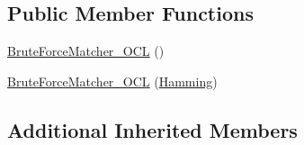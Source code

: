 \subsection*{Public Member Functions}
\begin{DoxyCompactItemize}
\item 
\hyperlink{classcv_1_1ocl_1_1BruteForceMatcher__OCL_3_01Hamming_01_4_a2e3e0dab5ac7caaf75fe7db67292d9a5}{Brute\-Force\-Matcher\-\_\-\-O\-C\-L} ()
\item 
\hyperlink{classcv_1_1ocl_1_1BruteForceMatcher__OCL_3_01Hamming_01_4_a02c49f8a2f475a9820060856debffa37}{Brute\-Force\-Matcher\-\_\-\-O\-C\-L} (\hyperlink{structcv_1_1ocl_1_1Hamming}{Hamming})
\end{DoxyCompactItemize}
\subsection*{Additional Inherited Members}


